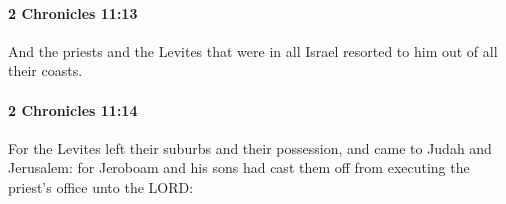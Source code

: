 		\paragraph{2 Chronicles 11:13} %
			\label{2CHRONICLES-11-13}

			And the priests and the Levites that were in all Israel resorted to him out of all their coasts.


		\paragraph{2 Chronicles 11:14} %
			\label{2CHRONICLES-11-14}

			For the Levites left their suburbs and their possession, and came to Judah and Jerusalem: for Jeroboam and his sons had cast them off from executing the priest's office unto the LORD:


